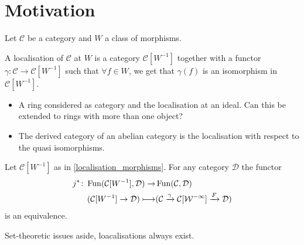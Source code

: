 \section{Motivation}

Let $\mathcal{C}$ be a category and $W$ a class of morphisms.

\begin{defi}
\label{localisation_morphisms}
    A localisation of $\mathcal{C}$ at $W$ is a category $\mathcal{C}[W^{-1}]$ together with a functor $\gamma\colon \mathcal{C} \to \mathcal{C}[W^{-1}]$ such that $\forall f \in W$, we get that $\gamma(f)$ is an isomorphism in $\mathcal{C}[W^{-1}]$.
\end{defi}

\begin{exmp}
    \begin{itemize}
        \item 
        A ring considered as category and the localisation at an ideal.
        Can this be extended to rings with more than one object?
        \item 
        The derived category of an abelian category is the localisation with respect to the quasi isomorphisms.
    \end{itemize}
\end{exmp}

\begin{prop}
    Let $\mathcal{C}[W^{-1}]$ as in \cref{localisation_morphisms}. 
    For any category $\mathcal{D}$ the functor 
        \begin{align*}
            j^*\colon\operatorname{Fun}(\mathcal{C}[W^{-1}], \mathcal{D}) 
            \to
            &
            \operatorname{Fun}(\mathcal{C},\mathcal{D})
            \\
            (\mathcal{C}[W^{-1}] \to 
            \mathcal{D})\longmapsto
            &
            (\mathcal{C} \xrightarrow{\gamma}
            \mathcal{C[W^{-1}]}
            \xrightarrow{F}
            \mathcal{D})
        \end{align*}
    is an equivalence.
\end{prop}

\begin{thm}
    Set-theoretic issues aside, loacalisations always exist. 
\end{thm}
    

